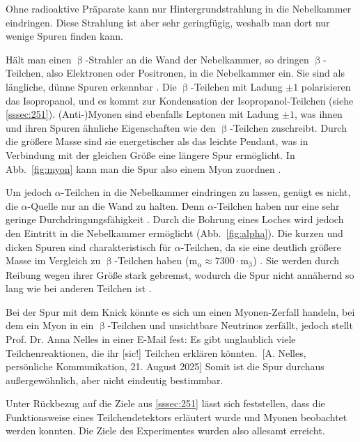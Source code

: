 \documentclass[a4paper,12pt]{article}
\newcommand{\figref}[1]{Abb.~\ref{#1}}
\begin{document}
Ohne radioaktive Präparate kann nur Hintergrundstrahlung in die Nebelkammer eindringen. Diese Strahlung ist aber sehr geringfügig, weshalb man dort nur wenige Spuren finden kann. \par
Hält man einen $\upbeta$-Strahler an die Wand der Nebelkammer, so dringen $\upbeta$-Teilchen, also Elektronen oder Positronen, in die Nebelkammer ein. Sie sind als längliche, dünne Spuren erkennbar \cite[167]{Kolanoski2016}. Die $\upbeta$-Teilchen mit Ladung $\pm 1$ polarisieren das Isopropanol, und es kommt zur Kondensation der Isopropanol-Teilchen (siehe \cref{sssec:251}). (Anti-)Myonen sind ebenfalls Leptonen mit Ladung $\pm 1$, was ihnen und ihren Spuren ähnliche Eigenschaften wie den $\upbeta$-Teilchen zuschreibt. Durch die größere Masse sind sie energetischer als das leichte Pendant, was in Verbindung mit der gleichen Größe eine längere Spur ermöglicht. In \figref{fig:myon} kann man die Spur also einem Myon zuordnen \cite[vgl.][167]{Kolanoski2016}. \par
Um jedoch $\alpha$-Teilchen in die Nebelkammer eindringen zu lassen, genügt es nicht, die $\alpha$-Quelle nur an die Wand zu halten. Denn $\alpha$-Teilchen haben nur eine sehr geringe Durchdringungsfähigkeit \cite[80]{Stolz2005}. Durch die Bohrung eines Loches wird jedoch den Eintritt in die Nebelkammer ermöglicht (\figref{fig:alpha}). Die kurzen und dicken Spuren sind charakteristisch für $\alpha$-Teilchen, da sie eine deutlich größere Masse im Vergleich zu $\upbeta$-Teilchen haben ($\mathrm{m_\upalpha} \approx 7300 \cdot \mathrm{m_\upbeta}$) \cite[51]{C.C.Buchner2012}. Sie werden durch Reibung wegen ihrer Größe stark gebremst, wodurch die Spur nicht annähernd so lang wie bei anderen Teilchen ist \cite[vgl.][167]{Kolanoski2016}. \par
Bei der Spur mit dem Knick könnte es sich um einen Myonen-Zerfall handeln, bei dem ein Myon in ein $\upbeta$-Teilchen und unsichtbare Neutrinos zerfällt, jedoch stellt Prof. Dr. Anna Nelles in einer E-Mail fest: \glqq Es gibt unglaublich viele Teilchenreaktionen, die ihr [sic!] Teilchen erklären könnten.\grqq \ [A. Nelles, persönliche Kommunikation, 21. August 2025] Somit ist die Spur durchaus außergewöhnlich, aber nicht eindeutig bestimmbar. \par
Unter Rückbezug auf die Ziele aus \cref{sssec:251} lässt sich feststellen, dass die Funktionsweise eines Teilchendetektors erläutert wurde und Myonen beobachtet werden konnten. Die Ziele des Experimentes wurden also allesamt erreicht. 
\end{document}
